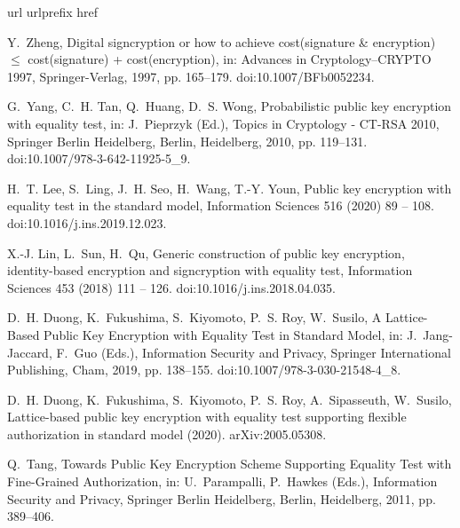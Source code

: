 \documentclass[a4paper,11pt,onecolumn]{elsarticle}
\begin{document}
\begin{thebibliography}{10}
\expandafter\ifx\csname url\endcsname\relax
  \def\url#1{\texttt{#1}}\fi
\expandafter\ifx\csname urlprefix\endcsname\relax\def\urlprefix{URL }\fi
\expandafter\ifx\csname href\endcsname\relax
  \def\href#1#2{#2} \def\path#1{#1}\fi

Y.~Zheng, {Digital signcryption or how to achieve cost(signature {\&}
  encryption) $\leq$ cost(signature) + cost(encryption)}, in: Advances in
  Cryptology--CRYPTO 1997, Springer-Verlag, 1997, pp. 165--179.
\newblock \href {http://dx.doi.org/10.1007/BFb0052234}
  {\path{doi:10.1007/BFb0052234}}.

G.~Yang, C.~H. Tan, Q.~Huang, D.~S. Wong, Probabilistic public key encryption
  with equality test, in: J.~Pieprzyk (Ed.), Topics in Cryptology - CT-RSA
  2010, Springer Berlin Heidelberg, Berlin, Heidelberg, 2010, pp. 119--131.
\newblock \href {http://dx.doi.org/10.1007/978-3-642-11925-5_9}
  {\path{doi:10.1007/978-3-642-11925-5_9}}.

H.~T. Lee, S.~Ling, J.~H. Seo, H.~Wang, T.-Y. Youn, {Public key encryption with
  equality test in the standard model}, Information Sciences 516 (2020) 89 --
  108.
\newblock \href {http://dx.doi.org/10.1016/j.ins.2019.12.023}
  {\path{doi:10.1016/j.ins.2019.12.023}}.

X.-J. Lin, L.~Sun, H.~Qu, {Generic construction of public key encryption,
  identity-based encryption and signcryption with equality test}, Information
  Sciences 453 (2018) 111 -- 126.
\newblock \href {http://dx.doi.org/10.1016/j.ins.2018.04.035}
  {\path{doi:10.1016/j.ins.2018.04.035}}.

D.~H. Duong, K.~Fukushima, S.~Kiyomoto, P.~S. Roy, W.~Susilo, {A Lattice-Based
  Public Key Encryption with Equality Test in Standard Model}, in:
  J.~Jang-Jaccard, F.~Guo (Eds.), Information Security and Privacy, Springer
  International Publishing, Cham, 2019, pp. 138--155.
\newblock \href {http://dx.doi.org/10.1007/978-3-030-21548-4_8}
  {\path{doi:10.1007/978-3-030-21548-4_8}}.

D.~H. Duong, K.~Fukushima, S.~Kiyomoto, P.~S. Roy, A.~Sipasseuth, W.~Susilo,
  {Lattice-based public key encryption with equality test supporting flexible
  authorization in standard model} (2020).
\newblock \href {http://arxiv.org/abs/2005.05308} {\path{arXiv:2005.05308}}.

Q.~Tang, {Towards Public Key Encryption Scheme Supporting Equality Test with
  Fine-Grained Authorization}, in: U.~Parampalli, P.~Hawkes (Eds.), Information
  Security and Privacy, Springer Berlin Heidelberg, Berlin, Heidelberg, 2011,
  pp. 389--406.


\end{thebibliography}
\end{document}
